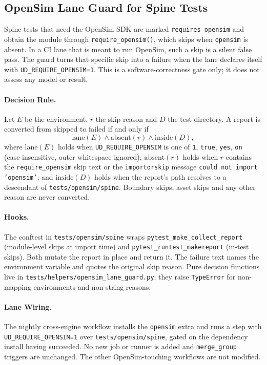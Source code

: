 \subsection{OpenSim Lane Guard for Spine Tests}
\label{sec:spn-7c}

Spine tests that need the OpenSim SDK are marked \texttt{requires\_opensim} and
obtain the module through \texttt{require\_opensim()}, which skips when
\texttt{opensim} is absent. In a CI lane that is meant to run OpenSim, such a
skip is a silent false pass. The guard turns that specific skip into a failure
when the lane declares itself with \texttt{UD\_REQUIRE\_OPENSIM=1}. This is a
software-correctness gate only; it does not assess any model or result.

\paragraph{Decision Rule.} Let $E$ be the environment, $r$ the skip reason and
$D$ the test directory. A report is converted from skipped to failed if and only if
\begin{equation}
  \mathrm{lane}(E) \land \mathrm{absent}(r) \land \mathrm{inside}(D),
\end{equation}
where $\mathrm{lane}(E)$ holds when \texttt{UD\_REQUIRE\_OPENSIM} is one of
\texttt{1}, \texttt{true}, \texttt{yes}, \texttt{on} (case-insensitive, outer
whitespace ignored); $\mathrm{absent}(r)$ holds when $r$ contains the
\texttt{require\_opensim} skip text or the \texttt{importorskip} message
\texttt{could not import 'opensim'}; and $\mathrm{inside}(D)$ holds when the
report's path resolves to a descendant of \texttt{tests/opensim/spine}. Boundary
skips, asset skips and any other reason are never converted.

\paragraph{Hooks.} The conftest in \texttt{tests/opensim/spine} wraps
\texttt{pytest\_make\_collect\_report} (module-level skips at import time) and
\texttt{pytest\_runtest\_makereport} (in-test skips). Both mutate the report in
place and return it. The failure text names the environment variable and quotes
the original skip reason. Pure decision functions live in
\texttt{tests/helpers/opensim\_lane\_guard.py}; they raise \texttt{TypeError}
for non-mapping environments and non-string reasons.

\paragraph{Lane Wiring.} The nightly cross-engine workflow installs the
\texttt{opensim} extra and runs a step with \texttt{UD\_REQUIRE\_OPENSIM=1}
over \texttt{tests/opensim/spine}, gated on the dependency install having
succeeded. No new job or runner is added and \texttt{merge\_group} triggers are
unchanged. The other OpenSim-touching workflows are not modified.

